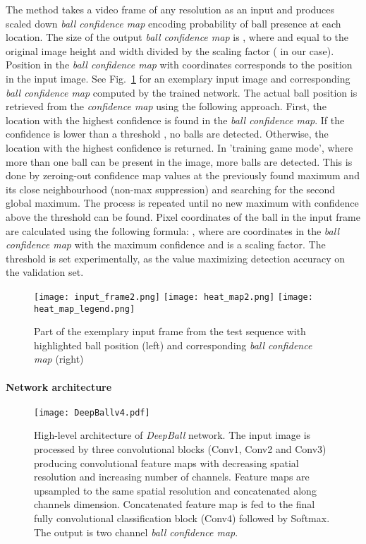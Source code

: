 \documentclass[a4paper,twoside]{article}
\begin{document}
The method takes a video frame of any resolution as an input and produces scaled down \emph{ball confidence map} encoding probability of ball presence at each location.
The size of the output \emph{ball confidence map} is  , where  and  equal to the original image height and width divided by the scaling  factor  ( in our case).
Position in the \emph{ball confidence map} with coordinates  corresponds to the position 
 in the input image.
See Fig.~\ref{jk:fig:input_output} for an exemplary input image and corresponding \emph{ball confidence map} computed by the trained network.
The actual ball position is retrieved from the \emph{confidence map} using the following approach. 
First, the location with the highest confidence is found in the \emph{ball confidence map}.
If the confidence is lower than a threshold , no balls are detected.
Otherwise, the location with the highest confidence is returned.
In 'training game mode', where more than one ball can be present in the image, more balls are detected. 
This is done by zeroing-out confidence map values at the previously found maximum and its close neighbourhood  (non-max suppression) and searching for the second global maximum.
The process is repeated until no new maximum with confidence above the threshold  can be found.
Pixel coordinates of the ball  in the input frame are calculated using the following formula:
, 
where  are coordinates in the \emph{ball confidence map} with the maximum confidence and  is a scaling factor.
The threshold  is set experimentally, as the value maximizing detection accuracy on the validation set.

\begin{figure}
\texttt{[image: input\_frame2.png]}
  \texttt{[image: heat\_map2.png]}
  \texttt{[image: heat\_map\_legend.png]}
  \caption{Part of the exemplary input frame from the test sequence with highlighted ball position (left) and corresponding \emph{ball confidence map} (right)}
\label{jk:fig:input_output}
\end{figure}

\paragraph{Network architecture}

\begin{figure*}
 \centering
  \texttt{[image: DeepBallv4.pdf]}
    \caption{High-level architecture of \emph{DeepBall} network.
    The input image is processed by three convolutional blocks (Conv1, Conv2 and Conv3) producing convolutional feature maps with decreasing spatial resolution and increasing number of channels.
    Feature maps are upsampled to the same spatial resolution and concatenated along channels dimension. Concatenated feature map is fed to the final fully convolutional classification block (Conv4) followed by Softmax. The output is two channel \emph{ball confidence map}.
    }
  \label{jk:fig:network-diagram}
\end{figure*}
\end{document}
